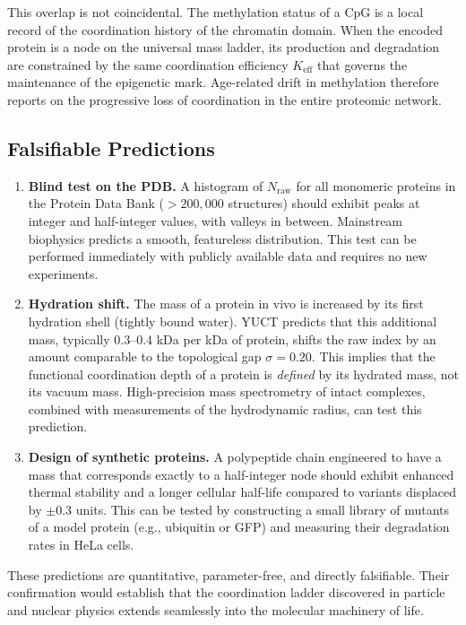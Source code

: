 \documentclass[12pt,a4paper]{article}
\begin{document}
	This overlap is not coincidental.  The methylation status of a CpG is a local record of the coordination history of the chromatin domain.  When the encoded protein is a node on the universal mass ladder, its production and degradation are constrained by the same coordination efficiency \(K_{\mathrm{eff}}\) that governs the maintenance of the epigenetic mark.  Age-related drift in methylation therefore reports on the progressive loss of coordination in the entire proteomic network.
	
	\subsection{Falsifiable Predictions}
	\begin{enumerate}
		\item \textbf{Blind test on the PDB.}  A histogram of \(N_{\mathrm{raw}}\) for all monomeric proteins in the Protein Data Bank (\(>200,000\) structures) should exhibit peaks at integer and half-integer values, with valleys in between.  Mainstream biophysics predicts a smooth, featureless distribution.  This test can be performed immediately with publicly available data and requires no new experiments.
		\item \textbf{Hydration shift.}  The mass of a protein in vivo is increased by its first hydration shell (tightly bound water).  YUCT predicts that this additional mass, typically \(0.3\)--\(0.4\) kDa per kDa of protein, shifts the raw index by an amount comparable to the topological gap \(\sigma = 0.20\).  This implies that the functional coordination depth of a protein is \emph{defined} by its hydrated mass, not its vacuum mass.  High-precision mass spectrometry of intact complexes, combined with measurements of the hydrodynamic radius, can test this prediction.
		\item \textbf{Design of synthetic proteins.}  A polypeptide chain engineered to have a mass that corresponds exactly to a half-integer node should exhibit enhanced thermal stability and a longer cellular half-life compared to variants displaced by \(\pm 0.3\) units.  This can be tested by constructing a small library of mutants of a model protein (e.g., ubiquitin or GFP) and measuring their degradation rates in HeLa cells.
	\end{enumerate}
	
	These predictions are quantitative, parameter-free, and directly falsifiable.  Their confirmation would establish that the coordination ladder discovered in particle and nuclear physics extends seamlessly into the molecular machinery of life.
	
\end{document}
